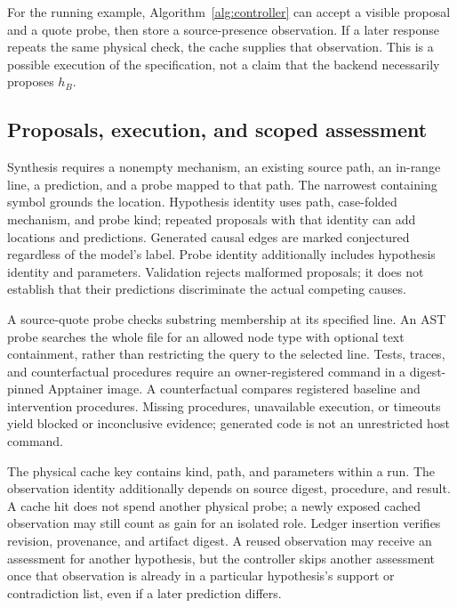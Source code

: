 \documentclass[letterpaper,journal]{IEEEtran}
\newcommand{\code}[1]{\texttt{\detokenize{#1}}}
\begin{document}
For the running example, Algorithm~\ref{alg:controller} can accept a visible \code{config.py} proposal and a quote probe, then store a source-presence observation. If a later response repeats the same physical check, the cache supplies that observation. This is a possible execution of the specification, not a claim that the backend necessarily proposes $h_B$.

\subsection{Proposals, execution, and scoped assessment}\label{sec:probes}
Synthesis requires a nonempty mechanism, an existing source path, an in-range line, a prediction, and a probe mapped to that path. The narrowest containing symbol grounds the location. Hypothesis identity uses path, case-folded mechanism, and probe kind; repeated proposals with that identity can add locations and predictions. Generated causal edges are marked conjectured regardless of the model's label. Probe identity additionally includes hypothesis identity and parameters. Validation rejects malformed proposals; it does not establish that their predictions discriminate the actual competing causes.

A source-quote probe checks substring membership at its specified line. An AST probe searches the whole file for an allowed node type with optional text containment, rather than restricting the query to the selected line. Tests, traces, and counterfactual procedures require an owner-registered command in a digest-pinned Apptainer image. A counterfactual compares registered baseline and intervention procedures. Missing procedures, unavailable execution, or timeouts yield blocked or inconclusive evidence; generated code is not an unrestricted host command.

The physical cache key contains kind, path, and parameters within a run. The observation identity additionally depends on source digest, procedure, and result. A cache hit does not spend another physical probe; a newly exposed cached observation may still count as gain for an isolated role. Ledger insertion verifies revision, provenance, and artifact digest. A reused observation may receive an assessment for another hypothesis, but the controller skips another assessment once that observation is already in a particular hypothesis's support or contradiction list, even if a later prediction differs.
\end{document}
